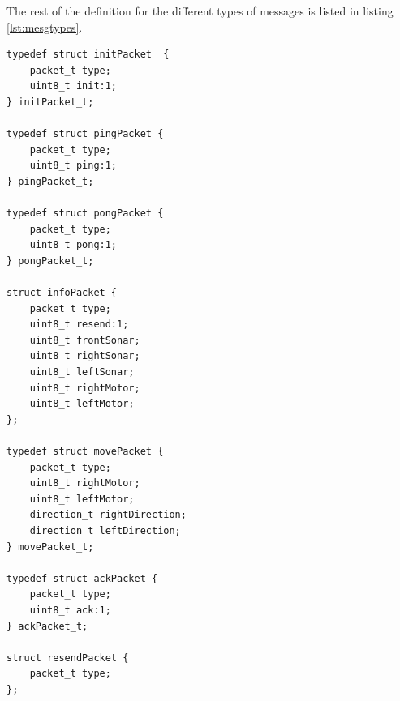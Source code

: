 The rest of the definition for the different types of messages is listed in
listing \ref{lst:mesgtypes}.
\begin{lstlisting}[label=lst:mesgtypes,float,
                   caption={Message Types Definitions}]
typedef struct initPacket  {
    packet_t type;
    uint8_t init:1;
} initPacket_t;

typedef struct pingPacket {
    packet_t type;
    uint8_t ping:1;
} pingPacket_t;

typedef struct pongPacket {
    packet_t type;
    uint8_t pong:1;
} pongPacket_t;

struct infoPacket {
    packet_t type;
    uint8_t resend:1;
    uint8_t frontSonar;
    uint8_t rightSonar;
    uint8_t leftSonar;
    uint8_t rightMotor;
    uint8_t leftMotor;
};

typedef struct movePacket {
    packet_t type;
    uint8_t rightMotor;
    uint8_t leftMotor;
    direction_t rightDirection;
    direction_t leftDirection;
} movePacket_t;

typedef struct ackPacket {
    packet_t type;
    uint8_t ack:1;
} ackPacket_t;

struct resendPacket {
    packet_t type;
};
\end{lstlisting}

